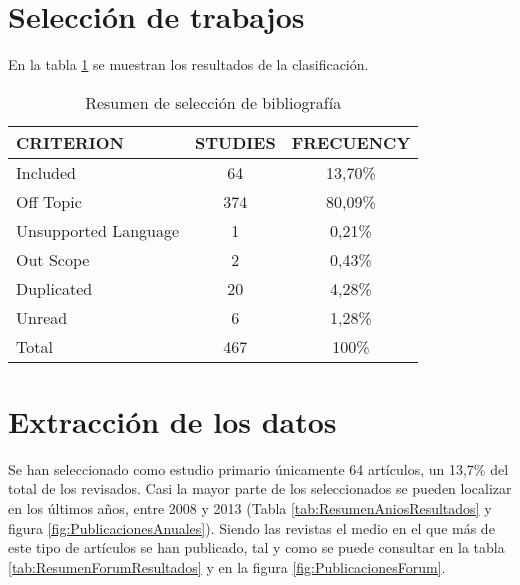 \section{Selección de trabajos}
En la tabla \ref{tab:ResumenSelecccionResultados} se muestran los resultados de la clasificación.

\begin{table}[H]
  \begin{center}
  \begin{tabular}{| m{4cm} | c | c |}
    \hline
    CRITERION & STUDIES & FRECUENCY\\
    \hline
    \hline 
    Included & 64 & 13,70\% \\
    \hline
    Off Topic & 374 & 80,09\% \\
    \hline
    Unsupported Language & 1 & 0,21\% \\
    \hline
    Out Scope & 2 & 0,43\% \\
    \hline
    Duplicated & 20 & 4,28\% \\
    \hline
    Unread & 6 & 1,28\% \\
    \hline
    Total & 467 & 100\% \\
    \hline
  \end{tabular}
\end{center}
\caption{Resumen de selección de bibliografía}
\label{tab:ResumenSelecccionResultados}
\end{table} 


\section{Extracción de los datos}
Se han seleccionado como estudio primario únicamente 64 artículos, un 13,7\% del total de los revisados. Casi la mayor parte de los seleccionados se pueden localizar en los últimos años, entre 2008 y 2013 (Tabla \ref{tab:ResumenAniosResultados} y figura \ref{fig:PublicacionesAnuales}). Siendo las revistas el medio en el que más de este tipo de artículos se han publicado, tal y como se puede consultar en la tabla \ref{tab:ResumenForumResultados} y en la figura \ref{fig:PublicacionesForum}.


